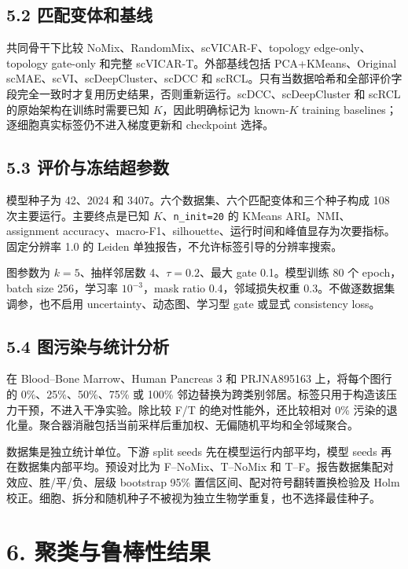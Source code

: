\documentclass[journal]{IEEEtran}
\begin{document}
\subsection{5.2 匹配变体和基线}

共同骨干下比较 NoMix、RandomMix、scVICAR-F、topology edge-only、topology gate-only 和完整 scVICAR-T。外部基线包括 PCA+KMeans、Original scMAE、scVI、scDeepCluster、scDCC 和 scRCL。只有当数据哈希和全部评价字段完全一致时才复用历史结果，否则重新运行。scDCC、scDeepCluster 和 scRCL 的原始架构在训练时需要已知 $K$，因此明确标记为 known-$K$ training baselines；逐细胞真实标签仍不进入梯度更新和 checkpoint 选择。

\subsection{5.3 评价与冻结超参数}

模型种子为 42、2024 和 3407。六个数据集、六个匹配变体和三个种子构成 108 次主要运行。主要终点是已知 $K$、\texttt{n\_init=20} 的 KMeans ARI。NMI、assignment accuracy、macro-F1、silhouette、运行时间和峰值显存为次要指标。固定分辨率 1.0 的 Leiden 单独报告，不允许标签引导的分辨率搜索。

图参数为 $k=5$、抽样邻居数 4、$\tau=0.2$、最大 gate 0.1。模型训练 80 个 epoch，batch size 256，学习率 $10^{-3}$，mask ratio 0.4，邻域损失权重 0.3。不做逐数据集调参，也不启用 uncertainty、动态图、学习型 gate 或显式 consistency loss。

\subsection{5.4 图污染与统计分析}

在 Blood–Bone Marrow、Human Pancreas 3 和 PRJNA895163 上，将每个图行的 0\%、25\%、50\%、75\% 或 100\% 邻边替换为跨类别邻居。标签只用于构造该压力干预，不进入干净实验。除比较 F/T 的绝对性能外，还比较相对 0\% 污染的退化量。聚合器消融包括当前采样后重加权、无偏随机平均和全邻域聚合。

数据集是独立统计单位。下游 split seeds 先在模型运行内部平均，模型 seeds 再在数据集内部平均。预设对比为 F–NoMix、T–NoMix 和 T–F。报告数据集配对效应、胜/平/负、层级 bootstrap 95\% 置信区间、配对符号翻转置换检验及 Holm 校正。细胞、拆分和随机种子不被视为独立生物学重复，也不选择最佳种子。

\section{6. 聚类与鲁棒性结果}
\end{document}
